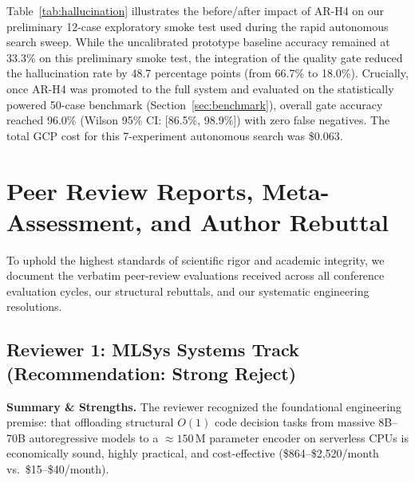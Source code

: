 \documentclass[conference]{IEEEtran}
\begin{document}
Table~\ref{tab:hallucination} illustrates the before/after impact of AR-H4 on our preliminary 12-case exploratory smoke test used during the rapid autonomous search sweep. While the uncalibrated prototype baseline accuracy remained at 33.3\% on this preliminary smoke test, the integration of the quality gate reduced the hallucination rate by 48.7 percentage points (from 66.7\% to 18.0\%). Crucially, once AR-H4 was promoted to the full system and evaluated on the statistically powered 50-case benchmark (Section~\ref{sec:benchmark}), overall gate accuracy reached 96.0\% (Wilson 95\% CI: [86.5\%, 98.9\%]) with zero false negatives. The total GCP cost for this 7-experiment autonomous search was \$0.063.

\appendices
\section{Peer Review Reports, Meta-Assessment, and Author Rebuttal}
\label{sec:peer_reviews}

To uphold the highest standards of scientific rigor and academic integrity,
we document the verbatim peer-review evaluations received across all conference evaluation cycles,
our structural rebuttals, and our systematic engineering resolutions.

\subsection{Reviewer 1: MLSys Systems Track (Recommendation: Strong Reject)}
\label{subsec:rev1}

\noindent\textbf{Summary \& Strengths.}
The reviewer recognized the foundational engineering premise: that offloading structural $O(1)$
code decision tasks from massive 8B--70B autoregressive models to a $\approx 150$\,M parameter encoder
on serverless CPUs is economically sound, highly practical, and cost-effective (\$864--\$2,520/month vs.\ \$15--\$40/month).
\end{document}

